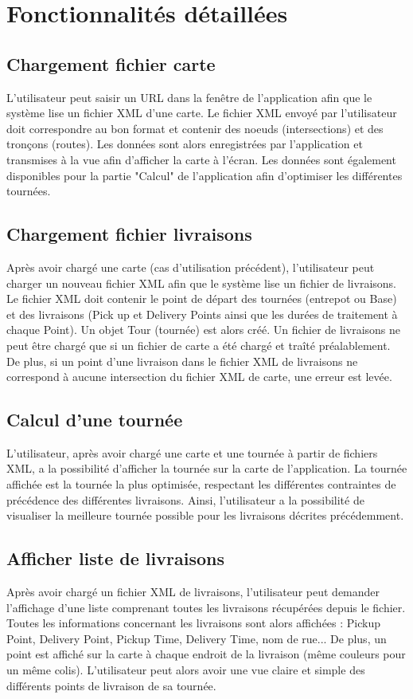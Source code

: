 \documentclass{scrartcl}
\begin{document}
\newpage
\section{Fonctionnalités détaillées}
\subsection{Chargement fichier carte}
L'utilisateur peut saisir un URL dans la fenêtre de l'application afin que le système lise un fichier XML d'une carte. Le fichier XML envoyé par l'utilisateur doit correspondre au bon format et contenir des noeuds (intersections) et des tronçons (routes). Les données sont alors enregistrées par l'application et transmises à la vue afin d'afficher la carte à l'écran. Les données sont également disponibles pour la partie "Calcul" de l'application afin d'optimiser les différentes tournées.

\subsection{Chargement fichier livraisons}
Après avoir chargé une carte (cas d'utilisation précédent), l'utilisateur peut charger un nouveau fichier XML afin que le système lise un fichier de livraisons. Le fichier XML doit contenir le point de départ des tournées (entrepot ou Base) et des livraisons (Pick up et Delivery Points ainsi que les durées de traitement à chaque Point). Un objet Tour (tournée) est alors créé. Un fichier de livraisons ne peut être chargé que si un fichier de carte a été chargé et traîté préalablement. De plus, si un point d'une livraison dans le fichier XML de livraisons ne correspond à aucune intersection du fichier XML de carte, une erreur est levée.

\subsection{Calcul d'une tournée}
L'utilisateur, après avoir chargé une carte et une tournée à partir de fichiers XML, a la possibilité d'afficher la tournée sur la carte de l'application. La tournée affichée est la tournée la plus optimisée, respectant les différentes contraintes de précédence des différentes livraisons. Ainsi, l'utilisateur a la possibilité de visualiser la meilleure tournée possible pour les livraisons décrites précédemment.

\subsection{Afficher liste de livraisons}
Après avoir chargé un fichier XML de livraisons, l'utilisateur peut demander l'affichage d'une liste comprenant toutes les livraisons récupérées depuis le fichier. Toutes les informations concernant les livraisons sont alors affichées : Pickup Point, Delivery Point, Pickup Time, Delivery Time, nom de rue...
De plus, un point est affiché sur la carte à chaque endroit de la livraison (même couleurs pour un même colis). L'utilisateur peut alors avoir une vue claire et simple des différents points de livraison de sa tournée.
\end{document}
